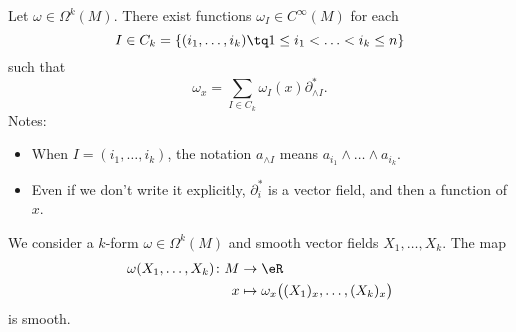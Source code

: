 \begin{proposition}		\label{PROPooNOGKooQedJba}
	Let \( \omega\in \Omega^k(M)\). There exist functions \( \omega_I\in C^{\infty}(M)\) for each
	\begin{equation}
		I\in C_k=\{ (i_1,\ldots,i_k)\tq 1\leq i_1<\ldots <i_k\leq n \}
	\end{equation}
	such that
	\begin{equation}
		\omega_x=\sum_{I\in C_k}\omega_I(x)\partial^*_{\wedge I}.
	\end{equation}
	Notes:
	\begin{itemize}
		\item
		      When \( I=(i_1,\ldots,i_k)\), the notation \( a_{\wedge I}\) means \( a_{i_1}\wedge \ldots\wedge a_{i_k}\).
		\item
		      Even if we don't write it explicitly, \( \partial^*_i\) is a vector field, and then a function of \( x\).
	\end{itemize}
\end{proposition}

\noproof


\begin{proposition}			\label{PROPooHTKMooVzYQdW}
	We consider a \( k\)-form \( \omega\in \Omega^k(M)\) and smooth vector fields \( X_1,\ldots,X_k\). The map
	\begin{equation}
		\begin{aligned}
			\omega(X_1,\ldots,X_k)\colon M & \to \eR                                            \\
			x                              & \mapsto \omega_x\big( (X_1)_x,\ldots,(X_k)_x \big)
		\end{aligned}
	\end{equation}
	is smooth.
\end{proposition}

